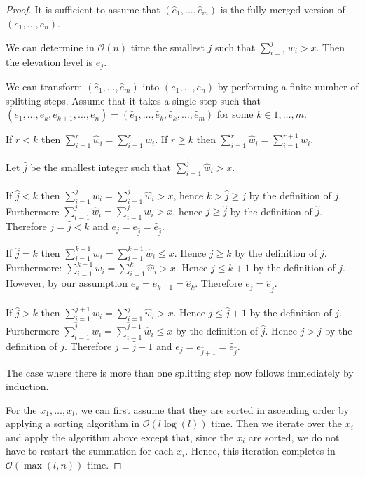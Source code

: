 \documentclass[11pt,a4paper]{article}
\newcommand{\bO}{\mathcal{O}}
\begin{document}
\begin{proof}
    It is sufficient to assume that $(\hat{e}_1,\ldots,\hat{e}_m)$ is the fully merged version of $(e_1,\ldots,e_n)$.

    We can determine in $\bO(n)$ time the smallest $j$ such that $\sum_{i=1}^j w_i > x$.
    Then the elevation level is $e_j$.

    We can transform $(\hat{e}_1,\ldots,\hat{e}_m)$ into $(e_1,\ldots,e_n)$ by performing a finite number of splitting steps.
    Assume that it takes a single step such that $(e_1,\ldots,e_k,e_{k+1},\ldots,e_n) = (\hat{e}_1,\ldots,\hat{e}_k,\hat{e}_k,\ldots,\hat{e}_m)$ for some $k\in{1,\ldots,m}$.

    If $r<k$ then $\sum_{i=1}^r \hat{w}_i = \sum_{i=1}^r w_i$.
    If $r\ge k$ then $\sum_{i=1}^r \hat{w}_i = \sum_{i=1}^{r+1} w_i$.

    Let $\hat{j}$ be the smallest integer such that $\sum_{i=1}^{\hat{j}} \hat{w}_i > x$.

    If $\hat{j}<k$ then $\sum_{i=1}^{\hat{j}} w_i = \sum_{i=1}^{\hat{j}} \hat{w}_i > x$, hence $k > \hat{j} \ge j$ by the definition of $j$.
    Furthermore $\sum_{i=1}^j \hat{w}_i = \sum_{i=1}^j w_i > x$, hence $j \ge \hat{j}$ by the definition of $\hat{j}$. 
    Therefore $j = \hat{j} < k$ and $e_j = e_{\hat{j}} = \hat{e}_{\hat{j}}$.

    If $\hat{j}=k$ then $\sum_{i=1}^{k-1} w_i = \sum_{i=1}^{k-1} \hat{w}_i \le x$.
    Hence $j\ge k$ by the definition of $j$.
    Furthermore: $\sum_{i=1}^{k+1} w_i = \sum_{i=1}^k \hat{w}_i > x$.
    Hence $j\le k+1$ by the definition of $j$.
    However, by our assumption $e_k = e_{k+1} = \hat{e}_k$.
    Therefore $e_j = \hat{e}_{\hat{j}}$.

    If $\hat{j}>k$ then $\sum_{i=1}^{\hat{j}+1} w_i = \sum_{i=1}^{\hat{j}} \hat{w}_i > x$.
    Hence $j\le \hat{j}+1$ by the definition of $j$.
    Furthermore $\sum_{i=1}^{\hat{j}} w_i = \sum_{i=1}^{\hat{j}-1} \hat{w}_i \le x$ by the definition of $\hat{j}$.
    Hence $j > \hat{j}$ by the definition of $j$.
    Therefore $j = \hat{j}+1$ and $e_j = e_{\hat{j}+1} = \hat{e}_{\hat{j}}$.

    The case where there is more than one splitting step now follows immediately by induction.

    For the $x_1,\ldots,x_l$, we can first assume that they are sorted in ascending order by applying a sorting algorithm in $\bO(l\log(l))$ time.
    Then we iterate over the $x_i$ and apply the algorithm above except that, since the $x_i$ are sorted, we do not have to restart the summation for each $x_i$.
    Hence, this iteration completes in $\bO(\max(l, n))$ time.
\end{proof}
\end{document}
